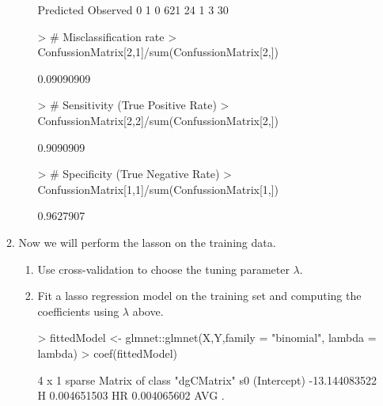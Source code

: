 \documentclass[12pt,a4paper]{paper}
\begin{document}
\begin{enumerate}
\begin{enumerate}
\begin{enumerate}
\begin{Schunk}
\begin{Sinput}
\end{Sinput}
\begin{Soutput}
        Predicted
Observed   0   1
       0 621  24
       1   3  30
\end{Soutput}
\begin{Sinput}
> # Misclassification rate
> ConfussionMatrix[2,1]/sum(ConfussionMatrix[2,])
\end{Sinput}
\begin{Soutput}
[1] 0.09090909
\end{Soutput}
\begin{Sinput}
> # Sensitivity (True Positive Rate)
> ConfussionMatrix[2,2]/sum(ConfussionMatrix[2,])
\end{Sinput}
\begin{Soutput}
[1] 0.9090909
\end{Soutput}
\begin{Sinput}
> # Specificity (True Negative Rate)
> ConfussionMatrix[1,1]/sum(ConfussionMatrix[1,])
\end{Sinput}
\begin{Soutput}
[1] 0.9627907
\end{Soutput}
\end{Schunk}
\end{enumerate}
\item Now we will perform the lasson on the training data.
\begin{enumerate}
\item Use cross-validation to choose the tuning parameter $\lambda$.
\begin{Schunk}
\end{Schunk}
\item Fit a lasso regression model on the training set and computing the coefficients using
$\lambda$ above.
\begin{Schunk}
\begin{Sinput}
> fittedModel <- glmnet::glmnet(X,Y,family = "binomial", lambda = lambda)
> coef(fittedModel)
\end{Sinput}
\begin{Soutput}
4 x 1 sparse Matrix of class "dgCMatrix"
                       s0
(Intercept) -13.144083522
H             0.004651503
HR            0.004065602
AVG           .          
\end{Soutput}

\end{Schunk}
\end{enumerate}
\end{enumerate}
\end{enumerate}
\end{document}
